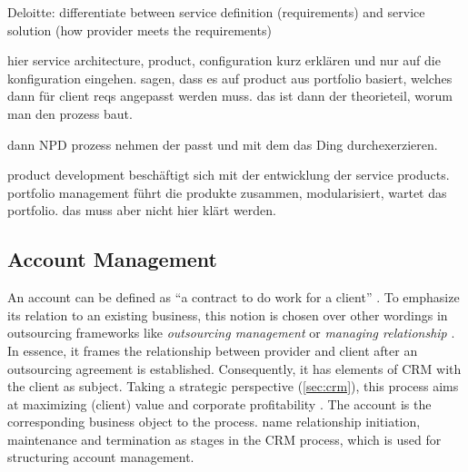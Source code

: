 	Deloitte: differentiate between service definition (\ie requirements) and service solution (how provider meets the requirements)
	
	
	hier service architecture, product, configuration kurz erklären und nur auf die konfiguration eingehen. sagen, dass es auf product aus portfolio basiert, welches dann für client reqs angepasst werden muss. das ist dann der theorieteil, worum man den prozess baut. 
	
	dann NPD prozess nehmen der passt und mit dem das Ding durchexerzieren. 
	
	 product development beschäftigt sich mit der entwicklung der service products. portfolio management führt die produkte zusammen, modularisiert, wartet das portfolio. das muss aber nicht hier klärt werden. 
	
	
	\subsection{Account Management}
	
	An account can be defined as \enquote{a contract to do work for a client} \citep{oxfordaccount}. To emphasize its relation to an existing business, this notion is chosen over other wordings in outsourcing frameworks like \textit{outsourcing management} \citep{Franceschini_2003} or \textit{managing relationship} \citep{perunovic2007outsourcing}. In essence, it frames the relationship between provider and client after an outsourcing agreement is established. Consequently, it has elements of \acrshort{CRM} with the client as subject. Taking a strategic perspective (\cf \ref{sec:crm}), this process aims at maximizing (client) value and corporate profitability \citep{payne2004role}. The account is the corresponding business object to the process. \cite{reinartz2004customer} name relationship initiation, maintenance and termination as stages in the \acrshort{CRM} process, which is used for structuring account management.
	

